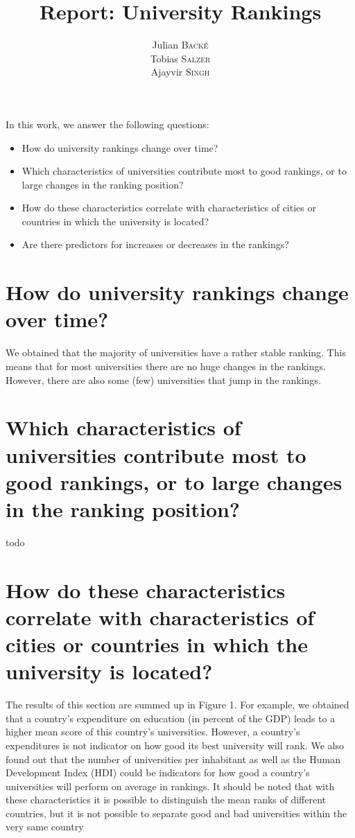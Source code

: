 \documentclass{article}
\title{Report: \textbf{University Rankings}} %
\author{Julian \textsc{Backé} \\ Tobias \textsc{Salzer} \\ Ajayvir \textsc{Singh}} %
\begin{document}
\maketitle %

In this work, we answer the following questions:

\begin{itemize}
	\item How do university rankings change over time? 
	
	\item Which characteristics of universities contribute most to good rankings, or to large changes in the ranking position? 
	
	\item How do these characteristics correlate with characteristics of cities or countries in which the university is located? 
	
	\item Are there predictors for increases or decreases in the rankings?
\end{itemize}

\section*{\large{How do university rankings change over time?}}
We obtained that the majority of universities have a rather stable ranking. This means that for most universities there are no huge changes in the rankings. However, there are also some (few) universities that jump in the rankings.

\section*{\large{Which characteristics of universities contribute most to good rankings, or to large changes in the ranking position?}}
todo

\section*{\large{How do these characteristics correlate with characteristics of cities or countries in which the university is located?}}

The results of this section are summed up in Figure 1. For example, we obtained that a country's expenditure on education (in percent of the GDP) leads to a higher mean score of this country's universities. However, a country's expenditures is not indicator on how good its best university will rank. We also found out that the number of universities per inhabitant as well as the Human Development Index (HDI) could be indicators for how good a country's universities will perform on average in rankings. It should be noted that with these characteristics it is possible to distinguish the mean ranks of different countries, but it is not possible to separate good and bad universities within the very same country
\end{document}
